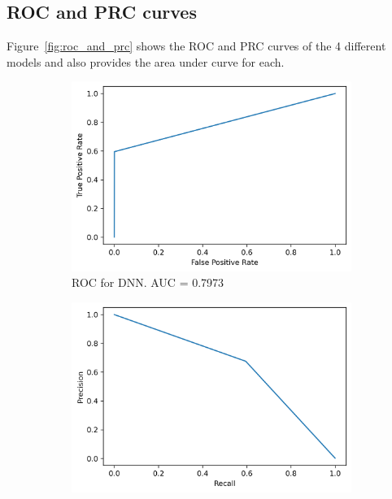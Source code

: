 \documentclass[utf8x]{ctexart}
\begin{document}
\subsection{ROC and PRC curves}

Figure~\ref{fig:roc_and_prc} shows the ROC and PRC curves of the 4 different models and also provides the area under curve for each.

\begin{figure}[htb]
  \centering
  \begin{subfigure}[b]{0.48\textwidth}
    \centering
    \includegraphics[width=\textwidth]{./images/net(d4_k8)_E50_LR0.0001_B64/roc.png}
    \caption{ROC for DNN. AUC = 0.7973}
    \label{fig:dnn_roc}
  \end{subfigure}
  \begin{subfigure}[b]{0.48\textwidth}
    \centering
    \includegraphics[width=\textwidth]{./images/net(d4_k8)_E50_LR0.0001_B64/prc.png}

\end{subfigure}
\end{figure}
\end{document}
